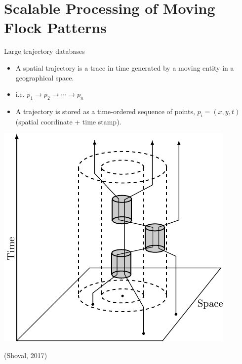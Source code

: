     \section{Scalable Processing of Moving Flock Patterns}

    \begin{frame}{Large trajectory databases}
        \begin{minipage}{0.59\textwidth}
            \begin{itemize}
                \item A spatial trajectory is a trace in time generated by a moving entity in a geographical space.
                \item i.e. $p_1 \rightarrow p_2 \rightarrow \cdots \rightarrow p_n$
                \item A trajectory is stored as a time-ordered sequence of points, $p_i = (x, y, t)$ (spatial coordinate + time stamp).
            \end{itemize}
        \end{minipage}\hfill %
        \begin{minipage}{0.4\textwidth}
            \includegraphics[width=\textwidth]{figures/trajectory}
            \begin{flushright}
                {\tiny (Shoval, 2017)}
            \end{flushright}
        \end{minipage}
    \end{frame}

